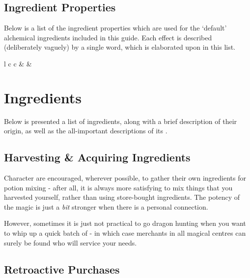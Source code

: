 
\newcommand\effect[3]
{
	{\footnotesize \key{#1}}	&	\parbox[t]{8cm}{\scriptsize #2} &	\parbox[t]{6cm}{\scriptsize #3} \\
}
\begin{strip}
\section{Ingredient Properties}
Below is a list of the ingredient properties which are used for the `default' alchemical ingredients included in this guide. Each effect is described (deliberately vaguely) by a single word, which is elaborated upon in this list. 
{\scriptsize 
\begin{center}
\begin{rndtable}{l c c}
	{\normalsize {}}	&	{\normalsize{}}	&	{\normalsize {}}
	\\
	\effectList{}
\end{rndtable}
\end{center}
}
\end{strip}

\section{Ingredients}

Below is presented a list of ingredients, along with a brief description of their origin, as well as the all-important descriptions of its . 

\subsection{Harvesting \& Acquiring Ingredients}

Character are encouraged, wherever possible, to gather their own ingredients for potion mixing - after all, it is always more satisfying to mix things that you harvested yourself, rather than using store-bought ingredients. The potency of the magic is just a {\it bit} stronger when there is a personal connection. 

However, sometimes it is just not practical to go dragon hunting when you want to whip up a quick batch of  - in which case merchants in all magical centres can surely be found who will service your needs. 

 
\subsection{Retroactive Purchases}

